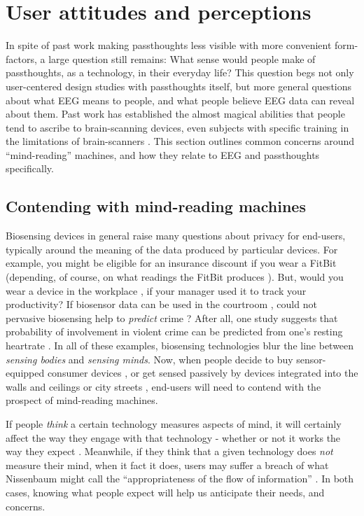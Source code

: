 \documentclass[sigconf]{acmart}
\begin{document}
\section{User attitudes and perceptions}
\label{sec:org356c7b0}

In spite of past work making passthoughts less visible with more convenient form-factors,
a large question still remains:
What sense would people make of passthoughts, as a technology, in their everyday life?
This question begs not only user-centered design studies with passthoughts itself,
but more general questions about what EEG means to people,
and what people believe EEG data can reveal about them.
Past work has established the almost magical abilities that people tend to ascribe to brain-scanning devices, even subjects with specific training in the limitations of brain-scanners \cite{Ali2014a}.
This section outlines common concerns around ``mind-reading'' machines, and how they relate to EEG and passthoughts specifically.

\subsection{Contending with mind-reading machines}
\label{sec:org42e4836}

Biosensing devices in general raise many questions about privacy for end-users,
typically around the meaning of the data produced by particular devices.
For example, you might be eligible for an insurance discount if you wear a FitBit \cite{Bernard2015} (depending, of course, on what readings the FitBit produces \cite{Brain2015}). 
But, would you wear a device in the workplace \cite{solon2015}, if your manager used it to track your productivity?
If biosensor data can be used in the courtroom \cite{Crawford2014}, could not pervasive biosensing help to \emph{predict} crime \cite{Thompson2011}? 
After all, one study suggests that probability of involvement in violent crime can be predicted from one's resting heartrate \cite{Latvala2015}. 
In all of these examples, biosensing technologies blur the line between \emph{sensing bodies} and \emph{sensing minds}. 
Now, when people decide to buy sensor-equipped consumer devices \cite{Stables2016}, or get sensed passively by devices integrated into the walls and ceilings \cite{Adib2015} or city streets \cite{Thrift2014}, end-users will need to contend with the prospect of mind-reading machines.

If people \emph{think} a certain technology measures aspects of mind, it will certainly affect the way they engage with that technology - whether or not it works the way they expect \cite{Ali2014a}. Meanwhile, if they think that a given technology does \emph{not} measure their mind, when it fact it does, users may suffer a breach of what Nissenbaum might call the ``appropriateness of the flow of information'' \cite{Doyle2011}. In both cases, knowing what people expect will help us anticipate their needs, and concerns.
\end{document}
